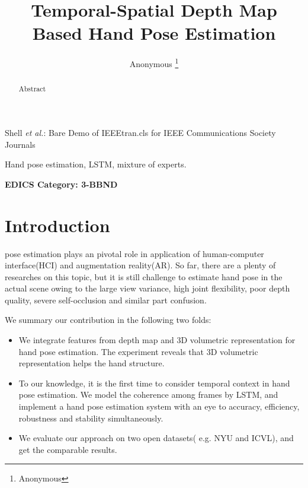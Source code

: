 \documentclass[journal,comsoc]{IEEEtran}
\begin{document}
\title{Temporal-Spatial Depth Map Based Hand Pose Estimation}

\author{{Anonymous}%
\thanks{Anonymous}}

%
{Shell \MakeLowercase{\textit{et al.}}: Bare Demo of IEEEtran.cls for IEEE Communications Society Journals}

\maketitle

\begin{abstract}
Abstract
\end{abstract}

\begin{IEEEkeywords}
Hand pose estimation, LSTM, mixture of experts.
\end{IEEEkeywords}


\ifCLASSOPTIONpeerreview
\begin{center} \bfseries EDICS Category: 3-BBND \end{center}
\fi
%
\IEEEpeerreviewmaketitle



\section{Introduction}\label{sec:introduction}
 pose estimation plays an pivotal role in application of human-computer interface(HCI) and augmentation reality(AR).
So far, there are a plenty of researches on this topic\cite{guo2017region}, but it is still challenge to estimate hand pose in the actual scene
owing to the large view variance, high joint flexibility, poor depth quality, severe self-occlusion and similar part confusion.

We summary our contribution in the following two folds:
\begin{itemize}
  \item
  We integrate features from depth map and 3D volumetric representation for hand pose estimation.
  The experiment reveals that 3D volumetric representation helps the hand structure.
  \item
  To our knowledge, it is the first time to consider temporal context in hand pose estimation.
  We model the coherence among frames by LSTM, and implement a hand pose estimation system with an eye to accuracy,
  efficiency, robustness and stability simultaneously.
  \item
  We evaluate our approach on two open datasets( e.g. NYU and ICVL), and get the comparable results.
\end{itemize}
\end{document}
